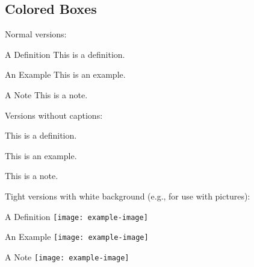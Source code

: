 \documentclass[
	aspectratio=169, %
	8pt, %
]{beamer}
\begin{document}
\subsection{Colored Boxes}
\begin{frame}{\insertsubsection}
	Normal versions:
	\begin{fancycolumns}[columns=3]
		\begin{definition}{A Definition}
			This is a definition.
		\end{definition}
	\nextcolumn
		\begin{example}{An {\color{blue} Example}}
			This is an example.
		\end{example}
	\nextcolumn
		\begin{note}{A {\color{red} Note}}
			This is a note.
		\end{note}
	\end{fancycolumns}
	\vfill
	Versions without captions:
	\begin{fancycolumns}[columns=3]
		\begin{definition}{}
			This is a {\color{orange} definition}.
		\end{definition}
	\nextcolumn
		\begin{example}{}
			This is an {\color{blue} example}.
		\end{example}
	\nextcolumn
		\begin{note}{}
			This is a {\color{red} note}.
		\end{note}
	\end{fancycolumns}
	\vfill
	Tight versions with white background (e.g., for use with pictures):
	\begin{fancycolumns}[columns=3]
		\begin{definitiontight}{A Definition}
			\centering\texttt{[image: example-image]}
		\end{definitiontight}
	\nextcolumn
		\begin{exampletight}{An Example}
			\centering\texttt{[image: example-image]}
		\end{exampletight}
	\nextcolumn
		\begin{notetight}{A Note}
			\centering\texttt{[image: example-image]}
		\end{notetight}
	\end{fancycolumns}
\end{frame}
\end{document}
